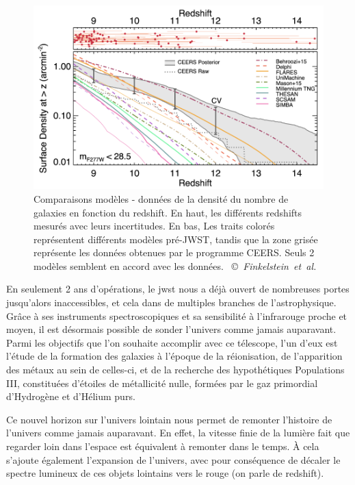 \documentclass[11pt, a4paper]{article}
\newcommand{\customcite}[2]{\mbox{
  {\small \copyright} \textit{#1} \cite{#2}}
}
\begin{document}
\begin{figure}
  \centering
  \includegraphics[scale=0.5]{assets/ceers_number_galaxies.png}
  \caption{Comparaisons modèles - données de la densité du nombre de galaxies en fonction du redshift. En haut, les différents redshifts mesurés avec leurs incertitudes. En bas, Les traits colorés représentent différents modèles pré-JWST, tandis que la zone grisée représente les données obtenues par le programme CEERS. Seuls 2 modèles semblent en accord avec les données. \customcite{Finkelstein et al.}{2023arXiv231104279F}}
  \label{fig:densite_galaxies}
\end{figure}

En seulement 2 ans d'opérations, le \gls{jwst} nous a déjà ouvert de nombreuses portes jusqu'alors inaccessibles, et cela dans de multiples branches de l'astrophysique. Grâce à ses instruments spectroscopiques et sa sensibilité à l'infrarouge proche et moyen, il est désormais possible de sonder l'univers comme jamais auparavant. Parmi les objectifs que l'on souhaite accomplir avec ce télescope, l'un d'eux est l'étude de la formation des galaxies à l'époque de la réionisation, de l'apparition des métaux au sein de celles-ci, et de la recherche des hypothétiques Populations III, constituées d'étoiles de métallicité nulle, formées par le gaz primordial d'Hydrogène et d'Hélium purs.

Ce nouvel horizon sur l'univers lointain nous permet de remonter l'histoire de l'univers comme jamais auparavant. En effet, la vitesse finie de la lumière fait que regarder loin dans l'espace est équivalent à remonter dans le temps. À cela s'ajoute également l'expansion de l'univers, avec pour conséquence de décaler le spectre lumineux de ces objets lointains vers le rouge (on parle de redshift).
\end{document}
